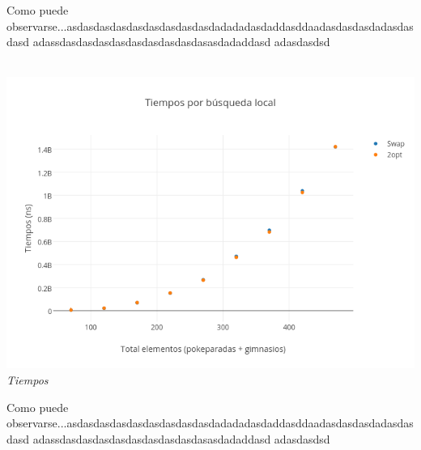 Como puede observarse...asdasdasdasdasdasdasdasdasdadadadasdaddasddaadasdasdasdadasdasdasd
adassdasdasdasdasdasdasdasdasdasasdadaddasd
adasdasdsd
\\\\

\begin{figure}[h] 
 \centering
       \label{fig:gruposDist2}
    \label{fig:gruposMejora2}
    \end{figure}
 
   \vspace*{0.3cm} \vspace*{0.3cm}
  \begin{center}
	\includegraphics[scale=0.40]{./EJ3/tiemposLocales470cuad.png}
	\label{fig:gruposTiempos2}	
	\\{\textit{Tiempos}}
  \end{center}
  \vspace*{0.3cm} 
 
Como puede observarse...asdasdasdasdasdasdasdasdasdadadadasdaddasddaadasdasdasdadasdasdasd
adassdasdasdasdasdasdasdasdasdasasdadaddasd
adasdasdsd
\\\\
  